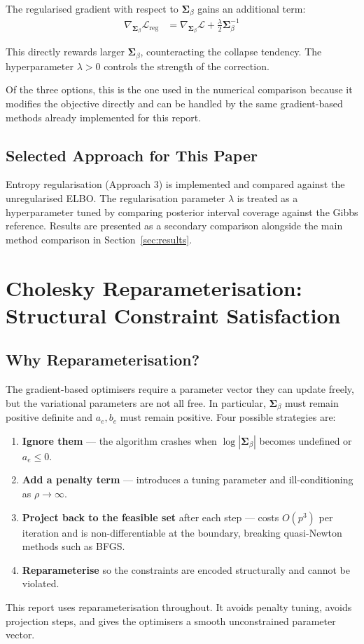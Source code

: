 \documentclass[11pt,a4paper]{article}
\begin{document}
The regularised gradient with respect to $\bm{\Sigma}_\beta$ gains an additional term:
\begin{align}
  \nabla_{\bm{\Sigma}_\beta} \mathcal{L}_{\text{reg}} &= \nabla_{\bm{\Sigma}_\beta} \mathcal{L} + \frac{\lambda}{2} \bm{\Sigma}_\beta^{-1}
\end{align}

This directly rewards larger $\bm{\Sigma}_\beta$, counteracting the collapse tendency. The hyperparameter $\lambda > 0$ controls the strength of the correction.

Of the three options, this is the one used in the numerical comparison because it modifies the objective directly and can be handled by the same gradient-based methods already implemented for this report.

\subsection*{Selected Approach for This Paper}

Entropy regularisation (Approach 3) is implemented and compared against the unregularised ELBO. The regularisation parameter $\lambda$ is treated as a hyperparameter tuned by comparing posterior interval coverage against the Gibbs reference. Results are presented as a secondary comparison alongside the main method comparison in Section~\ref{sec:results}.



\section{Cholesky Reparameterisation: Structural Constraint Satisfaction}\label{app:cholesky}

\subsection*{Why Reparameterisation?}

The gradient-based optimisers require a parameter vector they can update freely, but the variational parameters are not all free. In particular, $\bm{\Sigma}_\beta$ must remain positive definite and $a_e,b_e$ must remain positive. Four possible strategies are:
\begin{enumerate}
  \item \textbf{Ignore them} --- the algorithm crashes when $\log|\bm{\Sigma}_\beta|$ becomes undefined or $a_e \leq 0$.
  \item \textbf{Add a penalty term} --- introduces a tuning parameter and ill-conditioning as $\rho \to \infty$.
  \item \textbf{Project back to the feasible set} after each step --- costs $O(p^3)$ per iteration and is non-differentiable at the boundary, breaking quasi-Newton methods such as BFGS.
  \item \textbf{Reparameterise} so the constraints are encoded structurally and cannot be violated.
\end{enumerate}
This report uses reparameterisation throughout. It avoids penalty tuning, avoids projection steps, and gives the optimisers a smooth unconstrained parameter vector.
\end{document}

